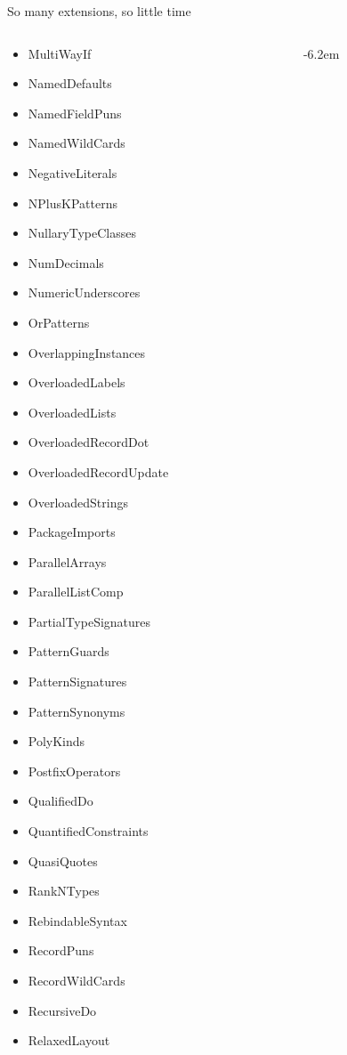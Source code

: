 \documentclass[handout]{beamer}
\begin{document}
\begin{frame}{So many extensions, so little time}
\begin{columns}[T]
\begin{column}{.32\textwidth}
\begin{itemize}
      \item MultiWayIf \item NamedDefaults \item NamedFieldPuns \item NamedWildCards \item NegativeLiterals \item NPlusKPatterns \item NullaryTypeClasses \item NumDecimals \item NumericUnderscores \item OrPatterns \item OverlappingInstances \item OverloadedLabels \item OverloadedLists \item OverloadedRecordDot \item OverloadedRecordUpdate \item OverloadedStrings \item PackageImports \item ParallelArrays \item ParallelListComp \item PartialTypeSignatures \item PatternGuards \item PatternSignatures \item PatternSynonyms \item PolyKinds \item PostfixOperators \item QualifiedDo \item QuantifiedConstraints \item QuasiQuotes \item RankNTypes \item RebindableSyntax \item RecordPuns \item RecordWildCards \item RecursiveDo \item RelaxedLayout
    \end{itemize}
  \end{column}
  \begin{column}{.33\textwidth}
    \begin{itemize}\itemsep0mm\itemindent-6.2em

\end{itemize}
\end{column}
\end{columns}
\end{frame}
\end{document}
